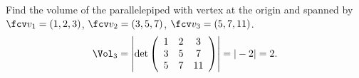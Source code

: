 \begin{frame}
\begin{example}
Find the volume of the parallelepiped with vertex at the origin and spanned by $\fcv v_1=(1,2,3)$, $\fcv v_2=(3,5,7)$, $\fcv v_3=(5,7,11)$.
\[
\Vol_3=\left| 
\det \left(\begin{array}{ccc} 1& 2& 3\\
3& 5& 7\\ 
5& 7& 11 \end{array}\right)\right|=|-2|=2.
\]
\end{example}
\end{frame}